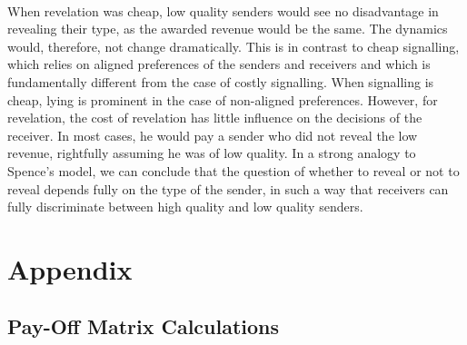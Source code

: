 \documentclass[a4paper,10pt]{article}
\numberwithin{equation}{section}
\begin{document}
\\
When revelation was cheap, low quality senders would see no disadvantage in revealing their type, as the awarded revenue would be the same. The dynamics would, therefore, not change dramatically. This is in contrast to cheap signalling, which relies on aligned preferences of the senders and receivers and which is fundamentally different from the case of costly signalling. When signalling is cheap, lying is prominent in the case of non-aligned preferences. However, for revelation, the cost of revelation has little influence on the decisions of the receiver. In most cases, he would pay a sender who did not reveal the low revenue, rightfully assuming he was of low quality. In a strong analogy to Spence's model, we can conclude that the question of whether to reveal or not to reveal depends fully on the type of the sender, in such a way that receivers can fully discriminate between high quality and low quality senders.

\newpage

\label{sec:Bibliography}
\renewcommand{\refname}{Bibliography\\} 



\newpage

\appendix
\label{sec:Appendix}
\section{Appendix}

\subsection{Pay-Off Matrix Calculations}
\label{sec:Pay-Off Matrix Calculations}
\end{document}
